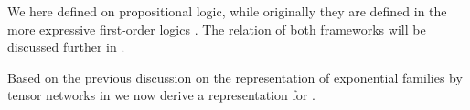 \begin{remark}
    We here defined \MarkovLogicNetworks{} on propositional logic, while originally they are defined in the more expressive first-order logics \cite{richardson_markov_2006}.
    The relation of both frameworks will be discussed further in .
\end{remark}




Based on the previous discussion on the representation of exponential families by tensor networks in  we now derive a representation for \MarkovLogicNetworks{}.


